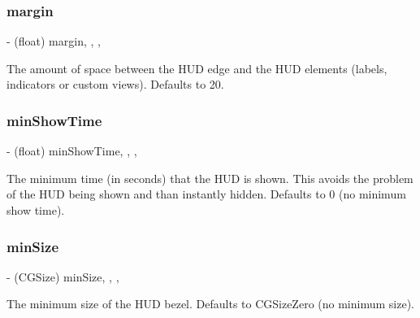 \subsubsection{\texorpdfstring{margin}{margin}}
{\footnotesize\ttfamily -\/ (float) margin\hspace{0.3cm}{\ttfamily [read]}, {\ttfamily [write]}, {\ttfamily [atomic]}, {\ttfamily [assign]}}

The amount of space between the H\+UD edge and the H\+UD elements (labels, indicators or custom views). Defaults to 20. \mbox{\label{interface_m_b_progress_h_u_d_a9946e4b0b16d75f070ff0cbcc50226ef}} 
\subsubsection{\texorpdfstring{min\+Show\+Time}{minShowTime}}
{\footnotesize\ttfamily -\/ (float) min\+Show\+Time\hspace{0.3cm}{\ttfamily [read]}, {\ttfamily [write]}, {\ttfamily [atomic]}, {\ttfamily [assign]}}

The minimum time (in seconds) that the H\+UD is shown. This avoids the problem of the H\+UD being shown and than instantly hidden. Defaults to 0 (no minimum show time). \mbox{\label{interface_m_b_progress_h_u_d_a69c6b2cad533d6fe7d90df02bf7f8b0c}} 
\subsubsection{\texorpdfstring{min\+Size}{minSize}}
{\footnotesize\ttfamily -\/ (C\+G\+Size) min\+Size\hspace{0.3cm}{\ttfamily [read]}, {\ttfamily [write]}, {\ttfamily [atomic]}, {\ttfamily [assign]}}

The minimum size of the H\+UD bezel. Defaults to C\+G\+Size\+Zero (no minimum size). \mbox{\label{interface_m_b_progress_h_u_d_ace77eaaf507e86fe56436f7ee7b6fdc9}} 
